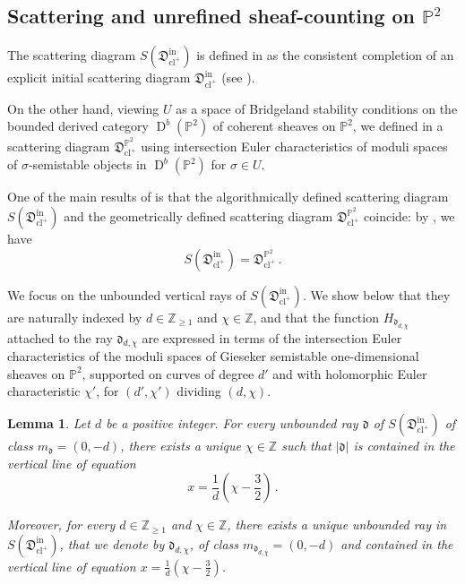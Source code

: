 \documentclass[11pt,letterpaper]{amsart}
\newtheorem{lem}[defn]{Lemma}
\newcommand\PP{\mathbb P}
\newcommand\Z{\mathbb Z}
\newcommand\fd{\mathfrak d}
\newcommand\fD{\mathfrak D}
\newcommand\cl{\operatorname{cl}}
\newcommand\D{\operatorname{D}}
\newcommand\iin{\mathrm{in}}
\begin{document}
\subsection{Scattering and unrefined sheaf-counting on $\PP^2$}
\label{section_vertical_sheaves}

The scattering diagram $S(\fD^\iin_{\cl^+})$ is defined 
in \cite{bousseau2019scattering} as the consistent completion of an explicit initial 
scattering diagram $\fD^\iin_{\cl^+}$ (see \cite[Definition 1.4.10]{bousseau2019scattering}). 

On the other hand, viewing $U$ as a space of Bridgeland stability conditions
on the bounded derived category $\D^b(\PP^2)$ of coherent sheaves on $\PP^2$, we defined in \cite[Definition 2.5.8]{bousseau2019scattering} a scattering diagram
$\fD^{\PP^2}_{\cl^+}$ using intersection Euler characteristics of 
moduli spaces of $\sigma$-semistable objects in $\D^b(\PP^2)$ for $\sigma \in U$.

One of the main results of \cite{bousseau2019scattering} is that the algorithmically defined scattering diagram $S(\fD^\iin_{\cl^+})$ and the geometrically defined 
scattering diagram $\fD^{\PP^2}_{\cl^+}$ coincide: by 
\cite[Theorem 5.2.3]{bousseau2019scattering}, we have
\[ S(\fD^\iin_{\cl^+}) = \fD^{\PP^2}_{\cl^+} \,.\]

We focus on the unbounded vertical rays of $S(\fD^\iin_{\cl^+})$. We show below that they are naturally indexed by $d \in \Z_{\geq 1}$ and $\chi \in \Z$, and that the function 
$H_{\fd_{d,\chi}}$ attached to the ray $\fd_{d,\chi}$ are expressed in terms of the intersection Euler characteristics of the moduli spaces of Gieseker semistable one-dimensional sheaves on $\PP^2$, supported on curves of degree $d'$ and with
holomorphic Euler characteristic $\chi'$, for $(d',\chi')$ dividing $(d,\chi)$.

\begin{lem} \label{lem_vertical_rays}
Let $d$ be a positive integer. For every unbounded ray $\fd$
of $S(\fD^\iin_{\cl^+})$ of class $m_\fd=(0,-d)$, there exists a unique $\chi \in \Z$ such that $|\fd|$ is contained in the vertical line of equation 
\[ x=\frac{1}{d}\left(\chi-\frac{3}{2}\right)\,.\]

Moreover, for every $d \in \Z_{\geqslant 1}$ and $\chi \in \Z$, there exists a unique unbounded ray in $S(\fD^\iin_{\cl^+})$, that we denote by
$\fd_{d,\chi}$, of class $m_{\fd_{d,\chi}}
=(0,-d)$ and contained in the vertical line of equation $ x=\frac{1}{d}\left(\chi-\frac{3}{2}\right)$.
\end{lem}
\end{document}

